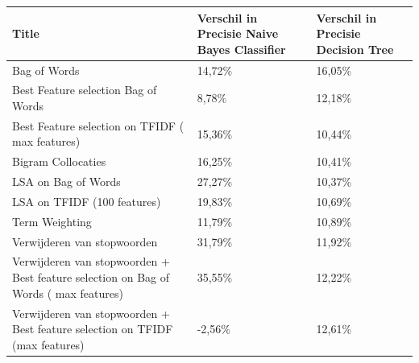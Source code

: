 \begin{table}[h]
\centering
\begin{adjustbox}{width=1\textwidth}
\begin{tabular}{|l|l|l|}
\hline
{\bf Title}                                                                          & {\bf Verschil in Precisie Naive Bayes Classifier} & {\bf Verschil in Precisie Decision Tree} \\ \hline
Bag of Words                                                                         & 14,72\%                                           & 16,05\%                                  \\ \hline
Best Feature selection Bag of Words                                                  & 8,78\%                                            & 12,18\%                                  \\ \hline
Best Feature selection on TFIDF ( max features)                                      & 15,36\%                                           & 10,44\%                                  \\ \hline
Bigram Collocaties                                                                   & 16,25\%                                           & 10,41\%                                  \\ \hline
LSA on Bag of Words                                                                  & 27,27\%                                           & 10,37\%                                  \\ \hline
LSA on TFIDF (100 features)                                                          & 19,83\%                                           & 10,69\%                                  \\ \hline
Term Weighting                                                                       & 11,79\%                                           & 10,89\%                                  \\ \hline
Verwijderen van stopwoorden                                                          & 31,79\%                                           & 11,92\%                                  \\ \hline
Verwijderen van stopwoorden + Best feature selection on Bag of Words ( max features) & 35,55\%                                           & 12,22\%                                  \\ \hline
Verwijderen van stopwoorden + Best feature selection on TFIDF (max features)         & -2,56\%                                           & 12,61\%                                  \\ \hline

\end{tabular}
\end{adjustbox}
\end{table}
